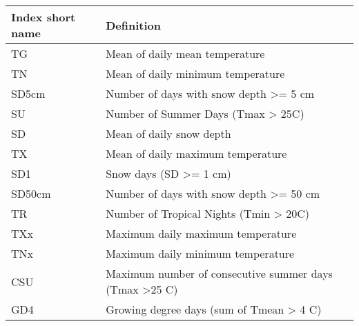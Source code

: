\documentclass[a4paper,11pt]{article}
\begin{document}
    \begin{table}[h]
    \begin{tabular}{l p{10cm}}
Index short name  &   Definition                                                                                                     \\
\hline
    TG            &   Mean of daily mean temperature                                                                                 \\
    TN            &   Mean of daily minimum temperature                                                                              \\
    SD5cm         &   Number of days with snow depth >= 5 cm                                                                         \\
    SU            &   Number of Summer Days (Tmax > 25C)                                                                             \\
    SD            &   Mean of daily snow depth                                                                                       \\
    TX            &   Mean of daily maximum temperature                                                                              \\
    SD1           &   Snow days (SD >= 1 cm)                                                                                         \\
    SD50cm        &   Number of days with snow depth >= 50 cm                                                                        \\
    TR            &   Number of Tropical Nights (Tmin > 20C)                                                                         \\
    TXx           &   Maximum daily maximum temperature                                                                              \\
    TNx           &   Maximum daily minimum temperature                                                                              \\
    CSU           &   Maximum number of consecutive summer days (Tmax >25 C)                                                         \\
    GD4           &   Growing degree days (sum of Tmean > 4 C)                                                                       \\

\end{tabular}
\end{table}
\end{document}
